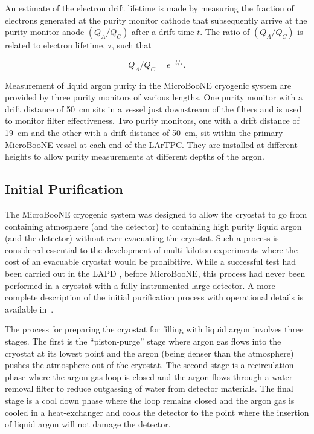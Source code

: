 An estimate of the electron drift lifetime is made by measuring the fraction of electrons generated at the purity monitor cathode that subsequently arrive at the purity monitor anode $(Q_A/Q_C)$ after a drift time $t$. The ratio of $(Q_A/Q_C)$ is related to electron lifetime, $\tau$, such that

\begin{equation}
Q_A/Q_C = e^{-t/\tau}.
\end{equation}

Measurement of liquid argon purity in the MicroBooNE cryogenic system are provided by three purity monitors of various lengths. One purity monitor with a drift distance of 50~cm sits in a vessel just downstream of the filters and is used to monitor filter effectiveness. Two purity monitors, one with a drift distance of 19~cm and the other with a drift distance of 50~cm, sit within the primary MicroBooNE vessel at each end of the LArTPC.  They are installed at different heights to allow purity measurements at different depths of the argon.


 \subsection{Initial Purification}
 The MicroBooNE cryogenic system was designed to allow the cryostat to go from containing atmosphere (and the detector) to containing high purity liquid argon (and the detector) without ever evacuating the cryostat. Such a process is considered essential to the development of multi-kiloton experiments where the cost of an evacuable cryostat would be prohibitive.  While a successful test had been carried out in the LAPD \cite{Adamowski:2014-LAPD}, before MicroBooNE, this process had never been performed in a cryostat with a fully instrumented large detector.  A more complete description of the initial purification process with operational details is available in~\cite{zuckerbrot}.
 
The process for preparing the cryostat for filling with liquid argon involves three stages.  The first is the ``piston-purge'' stage where argon gas flows into the cryostat at its lowest point and the argon (being denser than the atmosphere) pushes the atmosphere out of the cryostat.   The second stage is a recirculation phase where the argon-gas loop is closed and the argon flows through a water-removal filter to reduce outgassing of water from detector materials.  The final stage is a cool down phase where the loop remains closed and the argon gas is cooled in a heat-exchanger and cools the detector to the point where the insertion of liquid argon will not damage the detector.


